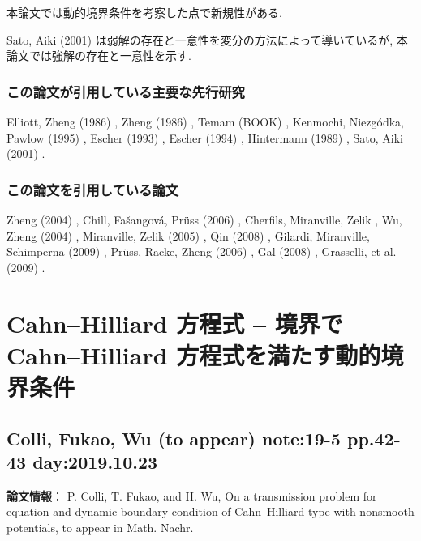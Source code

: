 \documentclass[a4paper]{article}
\begin{document}
		本論文では動的境界条件を考察した点で新規性がある.

		Sato, Aiki (2001) \cite{SatoAiki2001} は弱解の存在と一意性を変分の方法によって導いているが, 本論文では強解の存在と一意性を示す.
	\subsubsection{この論文が引用している主要な先行研究}
		Elliott, Zheng (1986) \cite{ElliottZheng1986}, Zheng (1986) \cite{Zheng1986}, Temam (BOOK) \cite{TemamBOOK}, Kenmochi, Niezg\'odka, Pawlow (1995) \cite{KenmochiNiezgodkaPawlow1995}, Escher (1993) \cite{Escher1993}, Escher (1994) \cite{Escher1994}, Hintermann (1989) \cite{Hintermann1989}, Sato, Aiki (2001) \cite{SatoAiki2001}.
	\subsubsection{この論文を引用している論文}
		Zheng (2004) \cite{ZhengBOOK}, Chill, Fa\v{s}angov\'a, Pr\"uss (2006) \cite{ChillETAL2006}, Cherfils, Miranville, Zelik \cite{CherfilsMiranvilleZelik2011}, Wu, Zheng (2004) \cite{WuZheng2004}, Miranville, Zelik (2005) \cite{MiranvilleZelik2005}, Qin (2008) \cite{QinBOOK}, Gilardi, Miranville, Schimperna (2009) \cite{GilardiMiranvilleSchimperna2009}, Pr\"uss, Racke, Zheng (2006) \cite{PrussRackeZheng2006}, Gal (2008) \cite{GalGrasselli2008}, Grasselli, et al. (2009) \cite{GrasselliSchimpernaSegattiZelik2009}.

\newpage

\section{Cahn--Hilliard 方程式 -- 境界で Cahn--Hilliard 方程式を満たす動的境界条件}

\subsection{Colli, Fukao, Wu (to appear) \cite{ColliFukaoWu2020} note:19-5 pp.42-43 day:2019.10.23}
{\bf 論文情報}：
P. Colli, T. Fukao, and H. Wu, On a transmission problem for equation and dynamic boundary condition of Cahn–Hilliard type with nonsmooth potentials, to appear in Math. Nachr.
\end{document}

